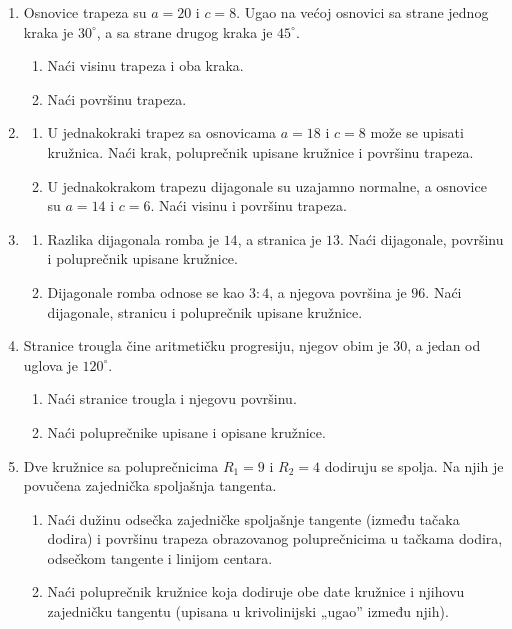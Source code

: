 \begin{enumerate}[label=\arabic*.]

\item Osnovice trapeza su $a=20$ i $c=8$. Ugao na većoj osnovici sa strane jednog kraka je $30^\circ$, a sa strane drugog kraka je $45^\circ$.
\begin{enumerate}[label=\alph*)]
\item Naći visinu trapeza i oba kraka.
\item Naći površinu trapeza.
\end{enumerate}

\item \begin{enumerate}[label=\alph*)]
\item U jednakokraki trapez sa osnovicama $a=18$ i $c=8$ može se upisati kružnica. Naći krak, poluprečnik upisane kružnice i površinu trapeza.
\item U jednakokrakom trapezu dijagonale su uzajamno normalne, a osnovice su $a=14$ i $c=6$. Naći visinu i površinu trapeza.
\end{enumerate}

\item \begin{enumerate}[label=\alph*)]
\item Razlika dijagonala romba je $14$, a stranica je $13$. Naći dijagonale, površinu i poluprečnik upisane kružnice.
\item Dijagonale romba odnose se kao $3:4$, a njegova površina je $96$. Naći dijagonale, stranicu i poluprečnik upisane kružnice.
\end{enumerate}

\item Stranice trougla čine aritmetičku progresiju, njegov obim je $30$, a jedan od uglova je $120^\circ$.
\begin{enumerate}[label=\alph*)]
\item Naći stranice trougla i njegovu površinu.
\item Naći poluprečnike upisane i opisane kružnice.
\end{enumerate}

\item Dve kružnice sa poluprečnicima $R_1=9$ i $R_2=4$ dodiruju se spolja. Na njih je povučena zajednička spoljašnja tangenta.
\begin{enumerate}[label=\alph*)]
\item Naći dužinu odsečka zajedničke spoljašnje tangente (između tačaka dodira) i površinu trapeza obrazovanog poluprečnicima u tačkama dodira, odsečkom tangente i linijom centara.
\item Naći poluprečnik kružnice koja dodiruje obe date kružnice i njihovu zajedničku tangentu (upisana u krivolinijski „ugao” između njih).
\end{enumerate}


\end{enumerate}
